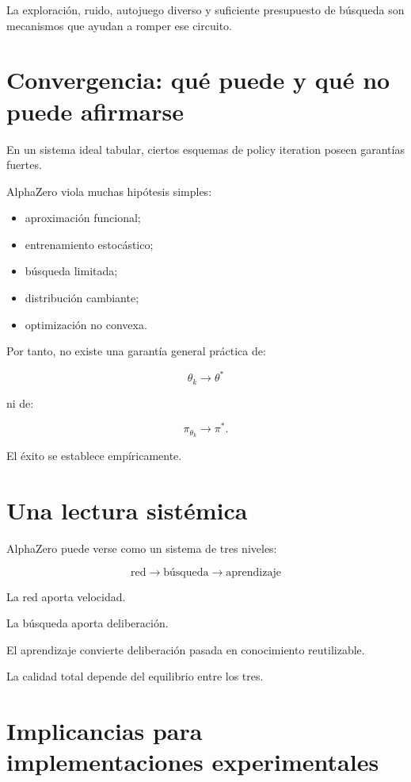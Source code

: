 \documentclass[11pt,a4paper]{article}
\begin{document}
La exploración, ruido, autojuego diverso y suficiente presupuesto de búsqueda son mecanismos que ayudan a romper ese circuito.

\section{Convergencia: qué puede y qué no puede afirmarse}

En un sistema ideal tabular, ciertos esquemas de policy iteration poseen garantías fuertes.

AlphaZero viola muchas hipótesis simples:

\begin{itemize}
    \item aproximación funcional;
    \item entrenamiento estocástico;
    \item búsqueda limitada;
    \item distribución cambiante;
    \item optimización no convexa.
\end{itemize}

Por tanto, no existe una garantía general práctica de:

\[
\theta_k
\rightarrow
\theta^*
\]

ni de:

\[
\pi_{\theta_k}
\rightarrow
\pi^*.
\]

El éxito se establece empíricamente.

\section{Una lectura sistémica}

AlphaZero puede verse como un sistema de tres niveles:

\[
\boxed{
\text{red}
\rightarrow
\text{búsqueda}
\rightarrow
\text{aprendizaje}
}
\]

La red aporta velocidad.

La búsqueda aporta deliberación.

El aprendizaje convierte deliberación pasada en conocimiento reutilizable.

La calidad total depende del equilibrio entre los tres.

\section{Implicancias para implementaciones experimentales}
\end{document}

